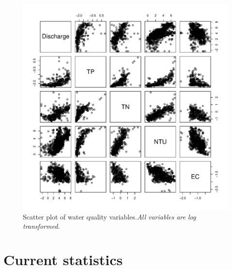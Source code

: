 \documentclass[5p]{elsarticle}
\begin{document}
\begin{center}
\begin{figure}
\includegraphics[scale=0.50]{Scatterplotmatrix.pdf}
\caption{Scatter plot of water quality variables.\it{All variables are log transformed.}}
\label{fig:correlation_plots}
\end{figure}
\end{center}



\pagebreak
\section*{Current statistics}
\end{document}
